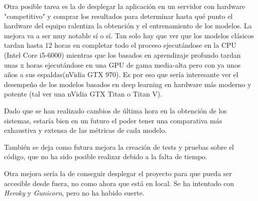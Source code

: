 Otra posible tarea es la de desplegar la aplicación en un servidor con hardware "competitivo" y comprar los resultados para determinar hasta qué punto el hardware del equipo ralentiza la obtención y el entrenamiento de los modelos. La mejora va a ser muy notable sí o sí. Tan solo hay que ver que los modelos clásicos tardan hasta 12 horas en completar todo el proceso ejecutándose en la CPU (Intel Core i5-6000) mientras que los basados en aprendizaje profundo tardan unas x horas ejecutándose en una GPU de gama media-alta pero con ya unos años a sus espaldas(nVidia GTX 970). Es por eso que sería interesante ver el desempeño de los modelos basados en deep learning en hardware más moderno y potente (tal ver una nVidia GTX Titan o Titan V).

Dado que se han realizado cambios de última hora en la obtención de los sistemas, estaría bien en un futuro el poder tener una comparativa más exhaustiva y extensa de las métricas de cada modelo.

También se deja como futura mejora la creación de tests y pruebas sobre el código, que no ha sido posible realizar debido a la falta de tiempo.

Otra mejora sería la de conseguir desplegar el proyecto para que pueda ser accesible desde fuera, no como ahora que está en local. Se ha intentado con \textit{Heroky} y \textit{Gunicorn}, pero no ha habido suerte.